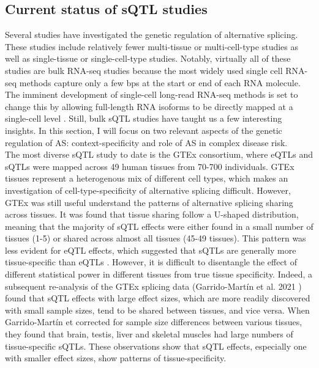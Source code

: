 \subsection{Current status of sQTL studies}
Several studies have investigated the genetic regulation of alternative splicing. These studies include relatively fewer multi-tissue or multi-cell-type studies as well as single-tissue or single-cell-type studies. Notably, virtually all of these studies are bulk RNA-seq studies because the most widely used single cell RNA-seq methods capture only a few bps at the start or end of each RNA molecule. The imminent development of single-cell long-read RNA-seq methods is set to change this by allowing full-length RNA isoforms to be directly mapped at a single-cell level \cite{Dong2023-xs}. Still, bulk sQTL studies have taught us a few interesting insights. In this section, I will focus on two relevant aspects of the genetic regulation of AS: context-specificity and role of AS in complex disease risk.\\

The most diverse sQTL study to date is the GTEx consortium, where eQTLs and sQTLs were mapped across 49 human tissues from 70-700 individuals. GTEx tissues represent a heterogenous mix of different cell types, which makes an investigation of cell-type-specificity of alternative splicing difficult. However, GTEx was still useful understand the patterns of alternative splicing sharing across tissues. It was found that tissue sharing follow a U-shaped distribution, meaning that the majority of sQTL effects were either found in a small number of tissues (1-5) or shared across almost all tissues (45-49 tissues). This pattern was less evident for eQTL effects, which suggested that sQTLs are generally more tissue-specific than eQTLs \cite{The_GTEx_Consortium2020-gg}. However, it is difficult to disentangle the effect of different statistical power in different tissues from true tissue specificity. Indeed, a subsequent re-analysis of the GTEx splicing data (Garrido-Martín et al. 2021 \cite{Garrido-Martin2021-sk}) found that sQTL effects with large effect sizes, which are more readily discovered with small sample sizes, tend to be shared between tissues, and vice versa. When Garrido-Martín et corrected for sample size differences between various tissues, they found that brain, testis, liver and skeletal muscles had large numbers of tissue-specific sQTLs. These observations show that sQTL effects, especially one with smaller effect sizes, show patterns of tissue-specificity. \\

